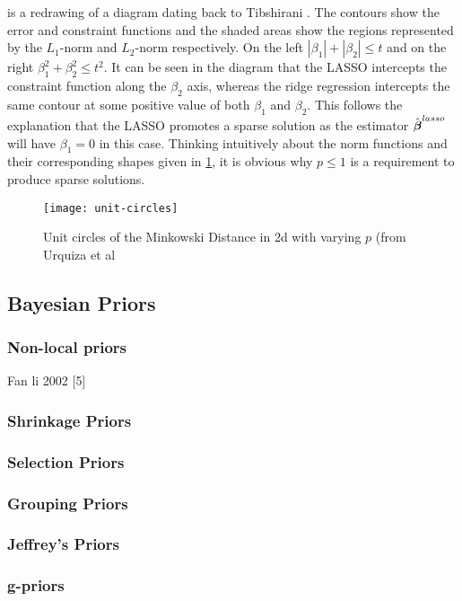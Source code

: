  is a redrawing of a diagram dating back to Tibshirani . The contours show the error and constraint functions and the shaded areas show the regions represented by the $L_1$-norm and $L_2$-norm respectively. On the left $|\beta_1|+|\beta_2|\leq t$ and on the right $\beta_1^2+\beta_2^2\leq t^2$. It can be seen in the diagram that the LASSO intercepts the constraint function along the $\beta_2$ axis, whereas the ridge regression intercepts the same contour at some positive value of both $\beta_1$ and $\beta_2$. This follows the explanation that the LASSO promotes a sparse solution as the estimator $\hat{\boldsymbol{\beta}}^{lasso}$ will have $\beta_1=0$ in this case. Thinking intuitively about the norm functions and their corresponding shapes given in \cref{fig:unit-circles}, it is obvious why $p\leq 1$ is a requirement to produce sparse solutions.

\begin{figure}[h!]
  \texttt{[image: unit-circles]}
  \caption{Unit circles of the Minkowski Distance in 2d with varying $p$ (from Urquiza et al }
  \label{fig:unit-circles}
\end{figure}

\subsection{Bayesian Priors}
\subsubsection{Non-local priors}
Fan li 2002 [5]
\subsubsection{Shrinkage Priors}
\subsubsection{Selection Priors}
\subsubsection{Grouping Priors}
\subsubsection{Jeffrey's Priors}
\subsubsection{g-priors}
